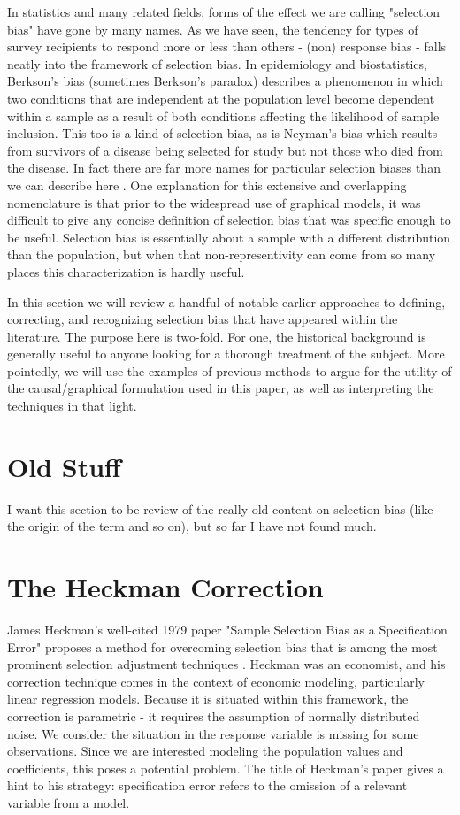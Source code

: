 \documentclass[12pt,twoside]{reedthesis}
\theoremstyle{definition}
\begin{document}
In statistics and many related fields, forms of the effect we are calling "selection bias" have gone by many names. As we have seen,  the tendency for types of survey recipients to respond more or less than others - (non) response bias - falls neatly into the framework of selection bias. In epidemiology and biostatistics, Berkson's bias (sometimes Berkson's paradox) describes a phenomenon in which two conditions that are independent at the population level become dependent within a sample as a result of both conditions affecting the likelihood of sample inclusion. This too is a kind of selection bias, as is Neyman's bias which results from survivors of a disease being selected for study but not those who died from the disease. In fact there are far more names for particular selection biases than we can describe here \citep{Delgado_2008}. One explanation for this extensive and overlapping nomenclature is that prior to the widespread use of graphical models, it was difficult to give any concise definition of selection bias that was specific enough to be useful. Selection bias is essentially about a sample with a different distribution than the population, but when that non-representivity can come from so many places this characterization is hardly useful.

In this section we will review a handful of notable earlier approaches to defining, correcting, and recognizing selection bias that have appeared within the literature. The purpose here is two-fold. For one, the historical background is generally useful to anyone looking for a thorough treatment of the subject. More pointedly, we will use the examples of previous methods to argue for the utility of the causal/graphical formulation used in this paper, as well as interpreting the techniques in that light.


\section{Old Stuff}

I want this section to be review of the really old content on selection bias (like the origin of the term and so on), but so far I have not found much.


\section{The Heckman Correction}
James Heckman's well-cited 1979 paper "Sample Selection Bias as a Specification Error" proposes a method for overcoming selection bias that is among the most prominent selection adjustment techniques \citep{Heckman_1979}. Heckman was an economist, and his correction technique comes in the context of economic modeling, particularly linear regression models. Because it is situated within this framework, the correction is parametric - it requires the  assumption of normally distributed noise. We consider the situation in the response variable is missing for some observations. Since we are interested modeling the population values and coefficients, this poses a potential problem. The title of Heckman's paper gives a hint to his strategy: specification error refers to the omission of a relevant variable from a model. 
\end{document}
